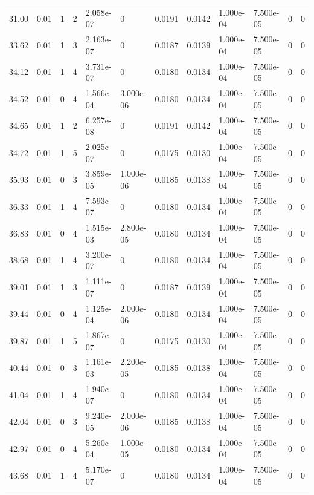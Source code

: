 \documentclass[preview]{standalone}
\begin{document}
{{{\begin{tabular}{L{1.2cm}C{1.2cm} C{0.3cm}C{0.5cm} C{1.4cm}C{1.4cm} C{1.4cm}C{1.4cm} C{1.6cm}C{1.6cm} C{1.6cm}C{1.6cm}}
  31.00  &  0.01  & 1     &  2 &  2.058e-07  & 0  &  0.0191&   0.0142& 1.000e-04 & 7.500e-05   &  0 & 0  \\ 
  33.62  &  0.01  & 1     &  3 &  2.163e-07  & 0  &  0.0187&   0.0139& 1.000e-04 & 7.500e-05   &  0 & 0  \\ 
  34.12  &  0.01  & 1     &  4 &  3.731e-07  & 0  &  0.0180&   0.0134& 1.000e-04 & 7.500e-05   &  0 & 0  \\ 
  34.52  &  0.01  & 0     &  4 &  1.566e-04  & 3.000e-06  &  0.0180&   0.0134& 1.000e-04 & 7.500e-05   &  0 & 0  \\ 
  34.65  &  0.01  & 1     &  2 &  6.257e-08  & 0  &  0.0191&   0.0142& 1.000e-04 & 7.500e-05   &  0 & 0  \\ 
  34.72  &  0.01  & 1     &  5 &  2.025e-07  & 0  &  0.0175&   0.0130& 1.000e-04 & 7.500e-05   &  0 & 0  \\ 
  35.93  &  0.01  & 0     &  3 &  3.859e-05  & 1.000e-06  &  0.0185&   0.0138& 1.000e-04 & 7.500e-05   &  0 & 0  \\ 
  36.33  &  0.01  & 1     &  4 &  7.593e-07  & 0  &  0.0180&   0.0134& 1.000e-04 & 7.500e-05   &  0 & 0  \\ 
  36.83  &  0.01  & 0     &  4 &  1.515e-03  & 2.800e-05  &  0.0180&   0.0134& 1.000e-04 & 7.500e-05   &  0 & 0  \\ 
  38.68  &  0.01  & 1     &  4 &  3.200e-07  & 0  &  0.0180&   0.0134& 1.000e-04 & 7.500e-05   &  0 & 0  \\ 
  39.01  &  0.01  & 1     &  3 &  1.111e-07  & 0  &  0.0187&   0.0139& 1.000e-04 & 7.500e-05   &  0 & 0  \\ 
  39.44  &  0.01  & 0     &  4 &  1.125e-04  & 2.000e-06  &  0.0180&   0.0134& 1.000e-04 & 7.500e-05   &  0 & 0  \\ 
  39.87  &  0.01  & 1     &  5 &  1.867e-07  & 0  &  0.0175&   0.0130& 1.000e-04 & 7.500e-05   &  0 & 0  \\ 
  40.44  &  0.01  & 0     &  3 &  1.161e-03  & 2.200e-05  &  0.0185&   0.0138& 1.000e-04 & 7.500e-05   &  0 & 0  \\ 
  41.04  &  0.01  & 1     &  4 &  1.940e-07  & 0  &  0.0180&   0.0134& 1.000e-04 & 7.500e-05   &  0 & 0  \\ 
  42.04  &  0.01  & 0     &  3 &  9.240e-05  & 2.000e-06  &  0.0185&   0.0138& 1.000e-04 & 7.500e-05   &  0 & 0  \\ 
  42.97  &  0.01  & 0     &  4 &  5.260e-04  & 1.000e-05  &  0.0180&   0.0134& 1.000e-04 & 7.500e-05   &  0 & 0  \\ 
  43.68  &  0.01  & 1     &  4 &  5.170e-07  & 0  &  0.0180&   0.0134& 1.000e-04 & 7.500e-05   &  0 & 0  \\ 

\end{tabular}}}}
\end{document}

